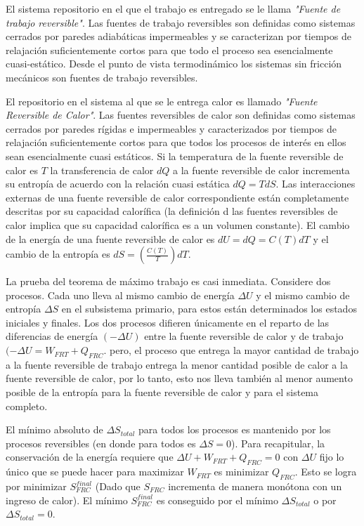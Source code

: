 \documentclass{report}
\begin{document}
El sistema repositorio en el que el trabajo es entregado se le llama \textit{"Fuente de trabajo reversible"}. Las fuentes de trabajo reversibles son definidas como sistemas cerrados por paredes adiabáticas impermeables y se caracterizan por tiempos de relajación suficientemente cortos para que todo el proceso sea esencialmente cuasi-estático. Desde el punto de vista termodinámico los sistemas sin fricción mecánicos son fuentes de trabajo reversibles.

El repositorio en el sistema al que se le entrega calor es llamado \textit{"Fuente Reversible de Calor"}. Las fuentes reversibles de calor son definidas como sistemas cerrados por paredes rígidas e impermeables y caracterizados por tiempos de relajación suficientemente cortos para que todos los procesos de interés en ellos sean esencialmente cuasi estáticos. Si la temperatura de la fuente reversible de calor es $T$ la transferencia de calor $dQ$ a la fuente reversible de calor incrementa su entropía de acuerdo con la relación cuasi estática $dQ = TdS$. Las interacciones externas de una fuente reversible de calor correspondiente están completamente descritas por su capacidad calorífica (la definición d las fuentes reversibles de calor implica que su capacidad calorífica es a un volumen constante). El cambio de la energía de una fuente reversible de calor es  $dU=dQ=C(T)dT$ y el cambio de la entropía es  $dS = \left(\frac{C(T)}{T}\right)dT$.

La prueba del teorema de máximo trabajo es casi inmediata. Considere dos procesos. Cada uno lleva al mismo cambio de energía $\Delta U$ y el mismo cambio de entropía  $\Delta S$ en el subsistema primario, para estos están determinados los estados iniciales y finales. Los dos procesos difieren únicamente en el reparto de las diferencias de energía $(-\Delta U)$ entre la fuente reversible de calor y de trabajo  $(-\Delta U = W_{FRT} + Q_{FRC}.$ pero, el proceso que entrega la mayor cantidad de trabajo a la fuente reversible de trabajo entrega la menor cantidad posible de calor a la fuente reversible de calor, por lo tanto, esto nos lleva también al menor aumento posible de la entropía para la fuente reversible de calor y para el sistema completo.

El mínimo absoluto de $\Delta S_{total}$ para todos los procesos es mantenido por los procesos reversibles (en donde para todos es $\Delta S = 0$).
Para recapitular, la conservación de la energía requiere que  $\Delta U + W_{FRT}+Q_{FRC}=0$ con $\Delta U$ fijo lo único que se puede hacer para maximizar $W_{FRT}$ es minimizar  $Q_{FRC}$. Esto se logra por minimizar  $S^{final}_{FRC}$ (Dado que  $S_{FRC}$ incrementa de manera monótona con un ingreso de calor). El mínimo  $S^{final}_{FRC}$ es conseguido por el mínimo $\Delta S_{total}$ o por  $\Delta S_{total} = 0$.
\end{document}
